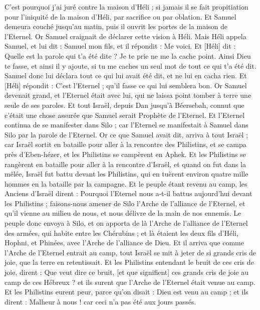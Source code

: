 \begin{multicols}{2}
C'est pourquoi j'ai juré contre la maison d'Héli ; si jamais il se fait propitiation pour l'iniquité de la maison d'Héli, par sacrifice ou par oblation.
Et Samuel demeura couché jusqu'au matin, puis il ouvrit les portes de la maison de l'Eternel. Or Samuel craignait de déclarer cette vision à Héli.
Mais Héli appela Samuel, et lui dit : Samuel mon fils, et il répondit : Me voici.
Et [Héli] dit : Quelle est la parole qui t'a été dite ? Je te prie ne me la cache point. Ainsi Dieu te fasse, et ainsi il y ajoute, si tu me caches un seul mot de tout ce qui t'a été dit.
Samuel donc lui déclara tout ce qui lui avait été dit, et ne lui en cacha rien. Et [Héli] répondit : C'est l'Eternel ; qu'il fasse ce qui lui semblera bon.
Or Samuel devenait grand, et l'Eternel était avec lui, qui ne laissa point tomber à terre une seule de ses paroles.
Et tout Israël, depuis Dan jusqu'à Béersebah, connut que c'était une chose assurée que Samuel serait Prophète de l'Eternel.
Et l'Eternel continua de se manifester dans Silo ; car l'Eternel se manifestait à Samuel dans Silo par la parole de l'Eternel.
\VerseOne{}Or ce que Samuel avait dit, arriva à tout Israël ; car Israël sortit en bataille pour aller à la rencontre des Philistins, et se campa près d'Eben-hézer, et les Philistins se campèrent en Aphek.
Et les Philistins se rangèrent en bataille pour aller à la rencontre d'Israël, et quand on fut dans la mêlée, Israël fut battu devant les Philistins, qui en tuèrent environ quatre mille hommes en la bataille par la campagne.
Et le peuple étant revenu au camp, les Anciens d'Israël dirent : Pourquoi l'Eternel nous a-t-il battus aujourd'hui devant les Philistins ; faisons-nous amener de Silo l'Arche de l'alliance de l'Eternel, et qu'il vienne au milieu de nous, et nous délivre de la main de nos ennemis.
Le peuple donc envoya à Silo, et on apporta de là l'Arche de l'alliance de l'Eternel des armées, qui habite entre les Chérubins ; et là étaient les deux fils d'Héli, Hophni, et Phinées, avec l'Arche de l'alliance de Dieu.
Et il arriva que comme l'Arche de l'Eternel entrait au camp, tout Israël se mit à jeter de si grands cris de joie, que la terre en retentissait.
Et les Philistins entendant le bruit de ces cris de joie, dirent : Que veut dire ce bruit, [et que signifient] ces grands cris de joie au camp de ces Hébreux ? et ils surent que l'Arche de l'Eternel était venue au camp.
Et les Philistins eurent peur, parce qu'on disait : Dieu est venu au camp ; et ils dirent : Malheur à nous ! car ceci n'a pas été aux jours passés.

\end{multicols}
